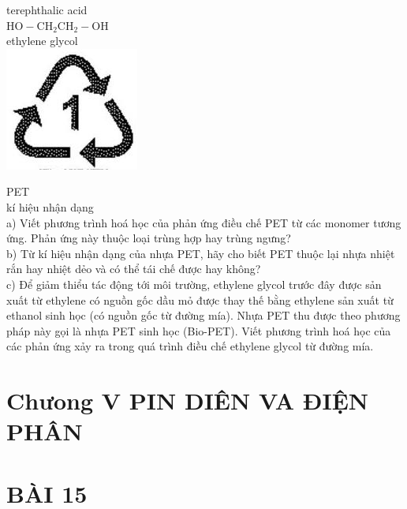 \documentclass[10pt]{article}
\begin{document}
terephthalic acid\\
$\mathrm{HO}-\mathrm{CH}_{2} \mathrm{CH}_{2}-\mathrm{OH}$\\
ethylene glycol\\
\includegraphics[max width=\textwidth, center]{2025_10_23_74efce88ce3a451fd6b0g-043}

PET\\
kí hiệu nhận dạng\\
a) Viết phương trình hoá học của phản ứng điều chế PET từ các monomer tương ứng. Phản ứng này thuộc loại trùng hợp hay trùng ngưng?\\
b) Từ kí hiệu nhận dạng của nhựa PET, hãy cho biết PET thuộc lại nhựa nhiệt rắn hay nhiệt dẻo và có thể tái chế được hay không?\\
c) Để giảm thiểu tác động tới môi trường, ethylene glycol trước đây được sản xuất từ ethylene có nguồn gốc dầu mỏ được thay thế bằng ethylene sản xuất từ ethanol sinh học (có nguồn gốc từ đường mía). Nhựa PET thu được theo phương pháp này gọi là nhựa PET sinh học (Bio-PET). Viết phương trình hoá học của các phản ứng xảy ra trong quá trình điều chế ethylene glycol từ đường mía.

\section*{Chưong V PIN DIÊN VA ĐIỆN PHÂN}
\section*{BÀI 15}
\end{document}
